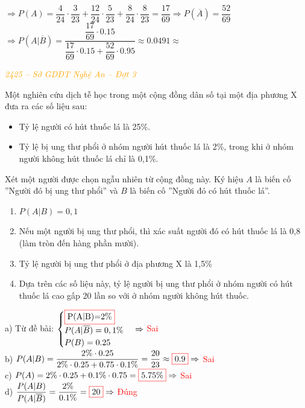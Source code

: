 \documentclass[twoside,final]{hcmut-report}
\newcommand{\exercise}[1]{\begin{exercisebox}#1\end{exercisebox}}
\newcommand{\result}[1]{\fcolorbox{red}{white}{#1}}
\begin{document}
$\Rightarrow P(A) = \dfrac{4}{24}\cdot\dfrac{3}{23} + \dfrac{12}{24}\cdot\dfrac{5}{23} + \dfrac{8}{24}\cdot\dfrac{8}{23} = \dfrac{17}{69} \Rightarrow P(\overline{A}) = \dfrac{52}{69}$\\
$\Rightarrow P(A|\overline{B}) = \dfrac{\dfrac{17}{69}\cdot 0.15}{\dfrac{17}{69}\cdot 0.15 + \dfrac{52}{69}\cdot0.95} \approx 0.0491 \approx$ \result{$0.05$}

\exercise{\textcolor{orange}{\textit{2425 -- Sở GDĐT Nghệ An -- Đợt 3}}

    Một nghiên cứu dịch tễ học trong một cộng đồng dân số tại một địa phương X đưa ra các số liệu sau:
    \begin{itemize}[itemsep=0pt, topsep=0pt, parsep=0pt,label=-]
        \item Tỷ lệ người có hút thuốc lá là 25\%.
        \item Tỷ lệ bị ung thư phổi ở nhóm người hút thuốc lá là 2\%, trong khi ở nhóm người không hút thuốc lá chỉ là 0,1\%.
    \end{itemize}

    Xét một người được chọn ngẫu nhiên từ cộng đồng này. Ký hiệu $A$ là biến cố ''Người đó bị ung thư phổi'' và $B$ là biến cố ''Người đó có hút thuốc lá''.
    \begin{enumerate}[itemsep=0pt, topsep=0pt, parsep=0pt,label=\alph*)]
        \item $P(A|B) = 0,1$
        \item Nếu một người bị ung thư phổi, thì xác suất người đó có hút thuốc lá là 0,8 (làm tròn đến hàng phần mười).
        \item Tỷ lệ người bị ung thư phổi ở địa phương X là 1,5\%
        \item Dựa trên các số liệu này, tỷ lệ người bị ung thư phổi ở nhóm người có hút thuốc lá cao gấp 20 lần so với ở nhóm người không hút thuốc.
    \end{enumerate}}
\begin{minipage}{0.55\textwidth}
    a) Từ đề bài: $\begin{cases}
            \result{P(A|B)=2\%}       \\
            P(A|\overline{B}) = 0,1\% \\
            P(B) = 0.25
        \end{cases} \Rightarrow$ \textcolor{red}{Sai}\\

    b) $P(A|B) = \dfrac{2\%\cdot 0.25}{2\%\cdot 0.25 + 0.75\cdot 0.1\%} = \dfrac{20}{23} \approx \result{0.9} \Rightarrow$ \textcolor{red}{Sai}\\

    c) $P(A) = 2\%\cdot 0.25 + 0.1\%\cdot 0.75 = \result{5.75\%} \Rightarrow$ \textcolor{red}{Sai}\\

    d) $\dfrac{P(A|B)}{P(A|\overline{B})} = \dfrac{2\%}{0.1\%} = \result{20}\Rightarrow$  \textcolor{red}{Đúng}
\end{minipage}
\end{document}
